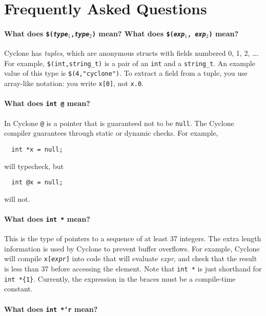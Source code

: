 \section{Frequently Asked Questions}

\paragraph{What does \texttt{\$({\it type}$_1$,{\it type}$_2$)} mean?
What does \texttt{\$({\it exp}$_1$, {\it exp}$_2$)} mean?}

Cyclone has \emph{tuples}, which are anonymous structs with fields
numbered 0, 1, 2, \ldots.  For example, \texttt{\$(int,string_t)} is a
pair of an \texttt{int} and a \texttt{string_t}.  An example value of
this type is \texttt{\$(4,"cyclone")}.  To extract a field from a
tuple, you use array-like notation: you write \texttt{x[0]}, not
\texttt{x.0}.

\paragraph{What does \texttt{int @} mean?}

In Cyclone \texttt{@} is a pointer that is guaranteed not to be
\texttt{null}.  The Cyclone compiler guarantees through static or
dynamic checks.  For example,
\begin{verbatim}
  int *x = null;
\end{verbatim}
will typecheck, but
\begin{verbatim}
  int @x = null;
\end{verbatim}
will not.

\paragraph{What does \texttt{int *\rb} mean?}

This is the type of pointers to a sequence of at least 37 integers.
The extra length information is used by Cyclone to prevent buffer
overflows.  For example, Cyclone will compile
\texttt{x[\textup{\textit{expr}}]} into code that will evaluate
\textit{expr}, and check that the result is less than 37 before
accessing the element.  Note that \texttt{int *} is just shorthand for
\verb|int *{1}|.  Currently, the expression in the braces must be a
compile-time constant.

\paragraph{What does \texttt{int *`r} mean?}

